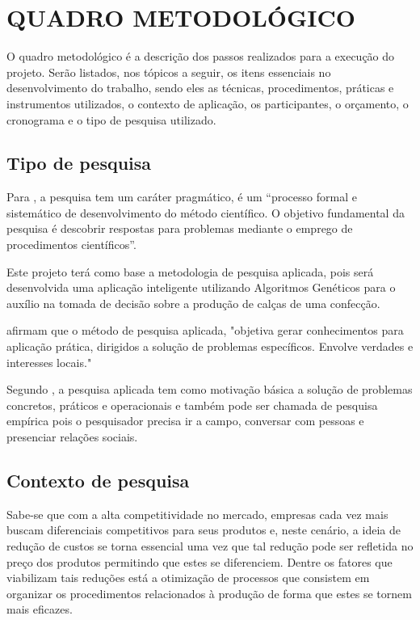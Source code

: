 
\chapter{QUADRO METODOLÓGICO}
\par O quadro metodológico é a descrição dos passos realizados para a 
execução do projeto. Serão listados, nos tópicos a seguir, os itens essenciais
no desenvolvimento do trabalho, sendo eles as técnicas, procedimentos, práticas e instrumentos
utilizados, o contexto de aplicação, os participantes, o orçamento, o cronograma
e o tipo de pesquisa utilizado.

\section{Tipo de pesquisa}

\par Para , a pesquisa tem um caráter
pragmático, é um “processo formal e sistemático de desenvolvimento do método científico. 
O objetivo fundamental da pesquisa é descobrir respostas para problemas mediante
o emprego de procedimentos científicos”.
\par Este projeto terá como base a metodologia de pesquisa aplicada, pois
será desenvolvida uma aplicação inteligente utilizando Algoritmos Genéticos para
o auxílio na tomada de decisão sobre a produção de calças de uma confecção.

\par {} afirmam que o método de
pesquisa aplicada, "objetiva gerar conhecimentos para aplicação prática, dirigidos a
solução de problemas específicos. Envolve verdades e interesses locais."  

\par Segundo , a pesquisa
aplicada tem como motivação básica a solução de problemas
concretos, práticos e operacionais e também pode ser chamada de pesquisa
empírica pois o pesquisador precisa ir a campo, conversar com pessoas e
presenciar relações sociais.

\section{Contexto de pesquisa}



\par Sabe-se que com a alta competitividade no mercado, empresas cada vez mais
buscam diferenciais competitivos para seus produtos e, neste cenário, a ideia
de redução de custos se torna essencial uma vez que tal redução pode ser
refletida no preço dos produtos permitindo que estes se diferenciem. Dentre
os fatores que viabilizam tais reduções está a otimização de processos que
consistem em organizar os procedimentos relacionados à produção de forma que
estes se tornem mais eficazes.

